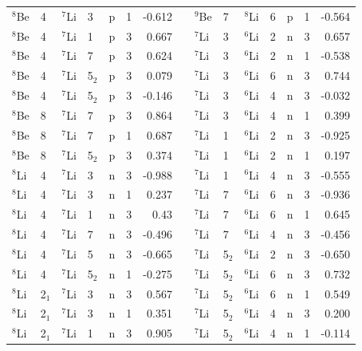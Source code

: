 \documentclass[10pt]{iopart}
\begin{document}
\begin{table}[tp]
\begin{tabular*}{\textwidth}{@{\extracolsep{\fill}}llllllrl@{\extracolsep{\fill}}llllllr@{\extracolsep{\fill}}}
$^8$Be  & 4  & $^7$Li   & 3   & p       & 1   & -0.612 &  & $^9$Be  & 7  & $^8$Li    & 6   & p       & 1   & -0.564  \\
$^8$Be  & 4  & $^7$Li   & 1   & p       & 3   & 0.667  &  & $^7$Li  & 3  & $^6$Li   & 2   & n       & 3   & 0.657   \\
$^8$Be  & 4  & $^7$Li   & 7   & p       & 3   & 0.624  &  & $^7$Li  & 3  & $^6$Li   & 2   & n       & 1   & -0.538  \\
$^8$Be  & 4  & $^7$Li   & 5$_2$   & p       & 3   & 0.079  &  & $^7$Li  & 3  & $^6$Li   & 6   & n       & 3   & 0.744   \\
$^8$Be  & 4  & $^7$Li   & 5$_2$   & p       & 3   & -0.146 &  & $^7$Li  & 3  & $^6$Li   & 4   & n       & 3   & -0.032  \\
$^8$Be  & 8  & $^7$Li   & 7   & p       & 3   & 0.864  &  & $^7$Li  & 3  & $^6$Li   & 4   & n       & 1   & 0.399   \\
$^8$Be  & 8  & $^7$Li   & 7   & p       & 1   & 0.687  &  & $^7$Li  & 1  & $^6$Li   & 2   & n       & 3   & -0.925  \\
$^8$Be  & 8  & $^7$Li   & 5$_2$   & p       & 3   & 0.374  &  & $^7$Li  & 1  & $^6$Li   & 2   & n       & 1   & 0.197   \\
$^8$Li  & 4  & $^7$Li   & 3   & n       & 3   & -0.988 &  & $^7$Li  & 1  & $^6$Li   & 4   & n       & 3   & -0.555  \\
$^8$Li  & 4  & $^7$Li   & 3   & n       & 1   & 0.237  &  & $^7$Li  & 7  & $^6$Li   & 6   & n       & 3   & -0.936  \\
$^8$Li  & 4  & $^7$Li   & 1   & n       & 3   & 0.43   &  & $^7$Li  & 7  & $^6$Li   & 6   & n       & 1   & 0.645   \\
$^8$Li  & 4  & $^7$Li   & 7   & n       & 3   & -0.496 &  & $^7$Li  & 7  & $^6$Li   & 4   & n       & 3   & -0.456  \\
$^8$Li  & 4  & $^7$Li   & 5   & n       & 3   & -0.665 &  & $^7$Li  & 5$_2$  & $^6$Li   & 2   & n       & 3   & -0.650   \\
$^8$Li  & 4  & $^7$Li   & 5$_2$   & n       & 1   & -0.275 &  & $^7$Li  & 5$_2$  & $^6$Li   & 6   & n       & 3   & 0.732   \\
$^8$Li  & 2$_1$  & $^7$Li   & 3   & n       & 3   & 0.567  &  & $^7$Li  & 5$_2$  & $^6$Li   & 6   & n       & 1   & 0.549   \\
$^8$Li  & 2$_1$  & $^7$Li   & 3   & n       & 1   & 0.351  &  & $^7$Li  & 5$_2$  & $^6$Li   & 4   & n       & 3   & 0.200     \\
$^8$Li  & 2$_1$  & $^7$Li   & 1   & n       & 3   & 0.905  &  & $^7$Li  & 5$_2$  & $^6$Li   & 4   & n       & 1   & -0.114  \\

\end{tabular*}
\end{table}
\end{document}
